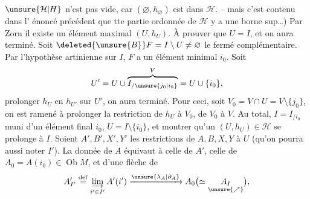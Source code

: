   $\unsure{\mathcal H|H}$ n'est pas vide, car $(\varnothing,h_\varnothing)$ est
dans $\mathcal H$. -- mais c'est contenu dans l'
énoncé précédent que tte partie  ordonnée
de $\mathcal H$ y a une borne sup\ldots) Par Zorn
il existe un élément maximal $(U,h_U)$.
À prouver que $U=I$, et on aura terminé.
Soit $\deleted{\unsure{B}}F=I\setminus U\ne\varnothing$ le fermé complémentaire.
Par l'hypothèse artinienne sur $I$,
$F$ a un élément minimal $i_0$. 
Soit
\[
 U'=U\cup\overbrace{I_{/\unsure{j_0|i_0}}}^{V}=U\cup\{i_0\},
\]
  prolonger $h_U$ en $h_{U'}$ sur $U'$,
on aura terminé. Pour ceci, soit
$V_0=V\cap U=V\setminus\{j_0\}$, on est ramené
à prolonger la restriction  de $h_U$ à $V_0$,
de $V_0$ à $V$. Au total, 
$I=I_{/i_0}$ muni d'un élément final $i_0$,
$U=I\setminus\{i_0\}$, et montrer qu'un
$(U,h_U)\in\mathcal H$ se prolonge à $I$. Soient
$A',B',X',Y'$ les restrictions de $A,B,X,Y$
à $U$  (qu'on pourra aussi noter $I'$).
La donnée de $A$ équivaut à celle
de $A'$, celle de $A_0=A(i_0)\in\operatorname{Ob} M$, et
d'une flèche de
\[
 A'_{I'}\overset{\mathrm{def}}{=}
 \underset{i'\in I'}{\underrightarrow{\lim}}\,A'(i')\xrightarrow{\unsure{\lambda_A|\partial_A}}
 A_0\bigl(\simeq\underset{\unsure{\nearrow}}{A_I}\bigr),
\]

